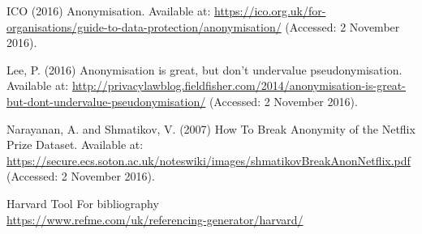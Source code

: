 \documentclass[9pt]{article}
\begin{document}
\begin{thebibliography}{99}
ICO (2016) Anonymisation. Available at: \url{https://ico.org.uk/for-organisations/guide-to-data-protection/anonymisation/} (Accessed: 2 November 2016).

Lee, P. (2016) Anonymisation is great, but don’t undervalue pseudonymisation. Available at: \url{http://privacylawblog.fieldfisher.com/2014/anonymisation-is-great-but-dont-undervalue-pseudonymisation/} (Accessed: 2 November 2016).

 Narayanan, A. and Shmatikov, V. (2007) How To Break Anonymity of the Netflix Prize Dataset. Available at: \url{https://secure.ecs.soton.ac.uk/noteswiki/images/shmatikovBreakAnonNetflix.pdf} (Accessed: 2 November 2016).

\bibitem []{}Harvard Tool For bibliography\\\newblock \url{https://www.refme.com/uk/referencing-generator/harvard/}
\end{thebibliography}
\end{document}
